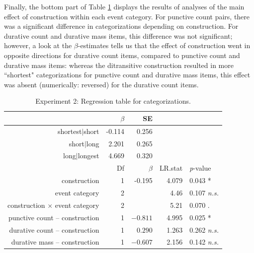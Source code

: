 \documentclass[preprint,12pt,authoryear]{elsarticle}
\begin{document}
Finally, the bottom part of Table \ref{tab_regrCat} displays the results of analyses of the main effect of construction within each event category. For punctive count pairs, there was a significant difference in categorizations depending on construction. For durative count and durative mass items, this difference was not significant; however, a look at the $\beta$-estimates tells us that the effect of construction went in opposite directions for durative count items, compared to punctive count and durative mass items: whereas the ditransitive construction resulted in more ``shortest" categorizations for punctive count and durative mass items, this effect was absent (numerically: reversed) for the durative count items.

\begin{table}[ht]
\centering
\begin{tabular}{rrrrl}
  \hline
 & $\beta$ & SE &  &  \\ 
  \hline
shortest$|$short & -0.114 & 0.256 &  &  \\ 
  short$|$long & 2.201 & 0.265 &  &  \\ 
  long$|$longest & 4.669 & 0.320 &  &  \\ \hline \hline
  & Df &$\beta$ & LR.stat &  \emph{p}-value \\ \hline
 construction & 1 & -0.195 & 4.079 & 0.043 *\\ 
 event category & 2 & & 4.46 & 0.107 \emph{n.s.} \\ 
  construction $\times$ event category & 2 & & 5.21 & 0.070 . \\  \hline
  
   punctive count -- construction    & 1 & $-0.811$ & 4.995 & 0.025 * \\    
   durative count -- construction    & 1  & $0.290$ & 1.263 & 0.262 \emph{n.s.} \\ 
   durative mass -- construction   & 1 & $-0.607$ & 2.156 & 0.142 \emph{n.s.} \\ \hline

\end{tabular}
\caption{Experiment 2: Regression table for categorizations. }
\label{tab_regrCat}
\end{table}
\end{document}
